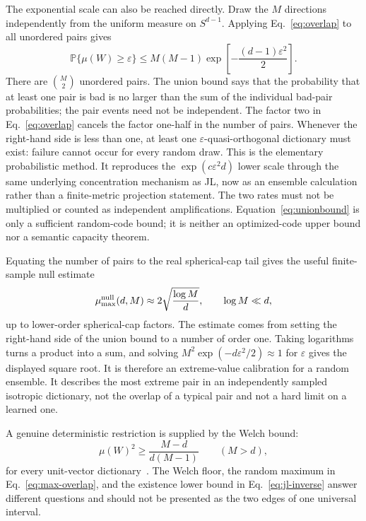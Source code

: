 \documentclass[
  aps,
  reprint,
  superscriptaddress,
  floatfix,
  nofootinbib,
  longbibliography
]{revtex4-2}
\newcommand{\Prob}{\mathbb{P}}
\newcommand{\Sph}[1]{S^{#1}}
\newcommand{\Msem}{M}
\begin{document}
The exponential scale can also be reached directly.  Draw the $\Msem$
directions independently from the uniform measure on $\Sph{d-1}$.  Applying
Eq.~\eqref{eq:overlap} to all unordered pairs gives
\begin{equation}
\label{eq:unionbound}
\Prob\{\mu(W)\geq\varepsilon\}
\leq
\Msem(\Msem-1)
\exp\!\left[-\frac{(d-1)\varepsilon^2}{2}\right].
\end{equation}
There are $\binom{\Msem}{2}$ unordered pairs.  The union bound says that the
probability that at least one pair is bad is no larger than the sum of the
individual bad-pair probabilities; the pair events need not be independent.
The factor two in Eq.~\eqref{eq:overlap} cancels the factor one-half in the
number of pairs.
Whenever the right-hand side is less than one, at least one
$\varepsilon$-quasi-orthogonal dictionary must exist: failure cannot occur for
every random draw.  This is the elementary probabilistic method.  It
reproduces the $\exp(c\varepsilon^2d)$ lower scale through the same underlying
concentration mechanism as JL, now as an ensemble calculation rather than a
finite-metric projection statement.  The two rates must not be multiplied or
counted as independent amplifications.  Equation~\eqref{eq:unionbound} is only
a sufficient random-code bound; it is neither an optimized-code upper bound
nor a semantic capacity theorem.

Equating the number of pairs to the real spherical-cap tail gives the useful
finite-sample null estimate
\begin{equation}
\label{eq:max-overlap}
\mu_{\max}^{\rm null}(d,\Msem)
\approx
2\sqrt{\frac{\log\Msem}{d}},
\qquad
\log\Msem\ll d,
\end{equation}
up to lower-order spherical-cap factors.
The estimate comes from setting the right-hand side of the union bound to a
number of order one.  Taking logarithms turns a product into a sum, and solving
$\Msem^2\exp(-d\varepsilon^2/2)\approx1$ for $\varepsilon$ gives the displayed
square root.  It is therefore an extreme-value calibration for a random
ensemble.  It describes the most extreme pair
in an independently sampled isotropic dictionary, not the overlap of a
typical pair and not a hard limit on a learned one.

A genuine deterministic restriction is supplied by the Welch bound:
\begin{equation}
\label{eq:welch}
\mu(W)^2
\geq
\frac{\Msem-d}{d(\Msem-1)}
\qquad(\Msem>d),
\end{equation}
for every unit-vector dictionary~\cite{welch1974coherence}.  The Welch floor,
the random maximum in Eq.~\eqref{eq:max-overlap}, and the existence lower
bound in Eq.~\eqref{eq:jl-inverse} answer different questions and should not
be presented as the two edges of one universal interval.
\end{document}
